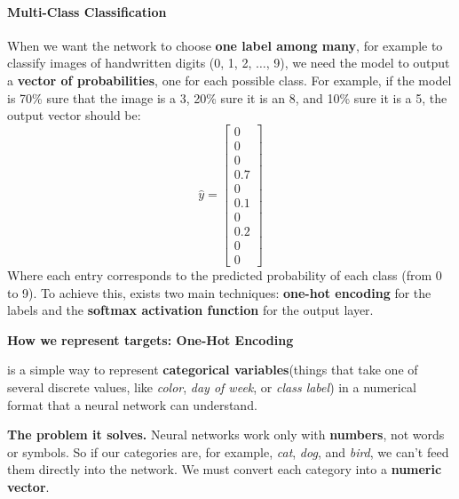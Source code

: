 \paragraph{Multi-Class Classification}

When we want the network to choose \textbf{one label among many}, for example to classify images of handwritten digits (0, 1, 2, $\dots$, 9), we need the model to output a \textbf{vector of probabilities}, one for each possible class. For example, if the model is 70\% sure that the image is a 3, 20\% sure it is an 8, and 10\% sure it is a 5, the output vector should be:
\begin{equation*}
    \hat{y} = \begin{bmatrix}
        0 \\
        0 \\
        0 \\
        0.7 \\
        0 \\
        0.1 \\
        0 \\
        0.2 \\
        0 \\
        0
    \end{bmatrix}
\end{equation*}
Where each entry corresponds to the predicted probability of each class (from 0 to 9). To achieve this, exists two main techniques: \textbf{one-hot encoding} for the labels and the \textbf{softmax activation function} for the output layer.

\highspace
\begin{flushleft}
    \textcolor{Green3}{ \textbf{How we represent targets: One-Hot Encoding}}
\end{flushleft}
 is a simple way to represent \textbf{categorical variables}\break (things that take one of several discrete values, like \emph{color}, \emph{day of week}, or \emph{class label}) in a numerical format that a neural network can understand.

\highspace
\textcolor{Green3}{ \textbf{The problem it solves.}} Neural networks work only with \textbf{numbers}, not words or symbols. So if our categories are, for example, \emph{cat}, \emph{dog}, and \emph{bird}, we can't feed them directly into the network. We must convert each category into a \textbf{numeric vector}.

